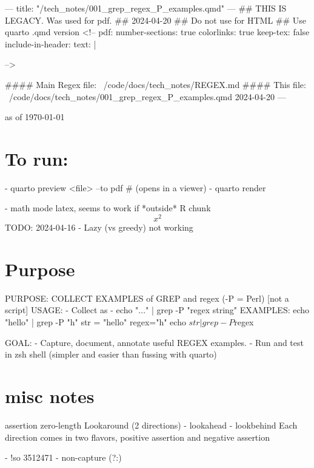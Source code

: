 ---
title: "/tech_notes/001_grep_regex_P_examples.qmd"
---
##	THIS IS LEGACY.   Was used for pdf.
##	2024-04-20
##	Do not use for HTML
##	Use quarto .qmd version
<!--
pdf:
	number-sections: true
	colorlinks: true
	keep-tex:  false
	include-in-header: 
		text: |
		    \usepackage[top=.5in, bottom=.5in, left=.5in, right=.5in]{geometry}
		    \usepackage{amsmath,amssymb,amstext,amsfonts}
		    \usepackage{lipsum}
		    \usepackage{setspace}

		    -->

#### Main Regex file:  ~/code/docs/tech_notes/REGEX.md
#### This file:  ~/code/docs/tech_notes/001_grep_regex_P_examples.qmd
2024-04-20
---

\footnotesize
as of \today

\section{To run:}

- quarto preview <file> --to pdf    # (opens in a viewer)
- quarto render %

- math mode latex,  seems to work if *outside* R chunk
$$
x^2
$$
TODO:
2024-04-16
-	Lazy (vs greedy) not working
\section{Purpose}

    PURPOSE:   COLLECT EXAMPLES of GREP and regex (-P = Perl) [not a script]
    USAGE:		
    -	Collect as
      -	echo "..." | grep -P "regex string"
	EXAMPLES:	
	echo "hello" | grep -P "h"
	str = "hello"
	regex="h"
	echo $str | grep -P $regex

    GOAL:  
	-	Capture, document, annotate useful REGEX examples.
	-	Run and test in zsh shell (simpler and easier than fussing with quarto)
\section{misc notes}
assertion
zero-length
Lookaround (2 directions)
	- lookahead
	- lookbehind
Each direction comes  in two flavors, positive assertion and negative assertion 

-	!so 3512471 - non-capture (?:)

